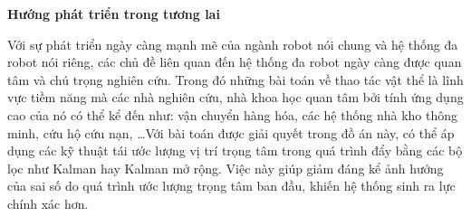 \vspace{2cm}

\textbf{Hướng phát triển trong tương lai}

Với sự phát triển ngày càng mạnh mẽ của ngành robot nói chung và hệ thống đa robot nói riêng, các chủ đề liên quan đến hệ thống đa robot ngày càng được quan tâm và chú trọng nghiên cứu. Trong đó những bài toán về thao tác vật thể là lĩnh vực tiềm năng mà các nhà nghiên cứu, nhà khoa học quan tâm bởi tính ứng dụng cao của nó có thể kể đến như: vận chuyển hàng hóa, các hệ thống nhà kho thông minh, cứu hộ cứu nạn, \ldots Với bài toán được giải quyết trong đồ án này, có thể áp dụng các kỹ thuật tái ước lượng vị trí trọng tâm trong quá trình đẩy bằng các bộ lọc như Kalman hay Kalman mở rộng. Việc này giúp giảm đáng kể ảnh hưởng của sai số do quá trình ước lượng trọng tâm ban đầu, khiến hệ thống sinh ra lực chính xác hơn. 